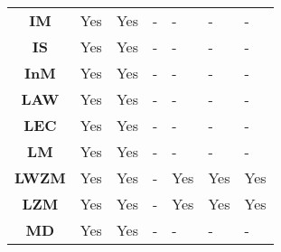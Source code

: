\begin{table}[ht!]
\begin{tabular}{cllllll}
\textbf{IM}          & Yes                                 & Yes                                 & -                                       & -                                        & -                                         & -                                         \\
\textbf{IS}          & Yes                                 & Yes                                 & -                                       & -                                        & -                                         & -                                         \\
\textbf{InM}         & Yes                                 & Yes                                 & -                                       & -                                        & -                                         & -                                         \\
\textbf{LAW}         & Yes                                 & Yes                                 & -                                       & -                                        & -                                         & -                                         \\
\textbf{LEC}         & Yes                                 & Yes                                 & -                                       & -                                        & -                                         & -                                         \\
\textbf{LM}          & Yes                                 & Yes                                 & -                                       & -                                        & -                                         & -                                         \\
\textbf{LWZM}        & Yes                                 & Yes                                 & -                                       & Yes                                      & Yes                                       & Yes                                       \\
\textbf{LZM}         & Yes                                 & Yes                                 & -                                       & Yes                                      & Yes                                       & Yes                                       \\
\textbf{MD}          & Yes                                 & Yes                                 & -                                       & -                                        & -                                         & -                                         \\

\end{tabular}
\end{table}

